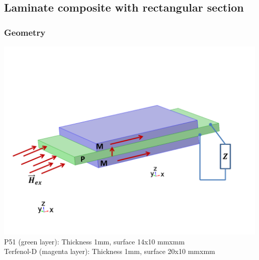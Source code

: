 \documentclass[compress]{beamer}
\begin{document}
\subsection{Laminate composite with rectangular section}
\begin{frame}\frametitle{Geometry}
\includegraphics[width=0.99\textwidth]{Graphic/03_georecta.pdf}
\centering
{
P51 (green layer): Thickness 1mm, surface 14x10 mmxmm \\
Terfenol-D (magenta layer): Thickness 1mm, surface 20x10 mmxmm	
}
\end{frame}
\end{document}

